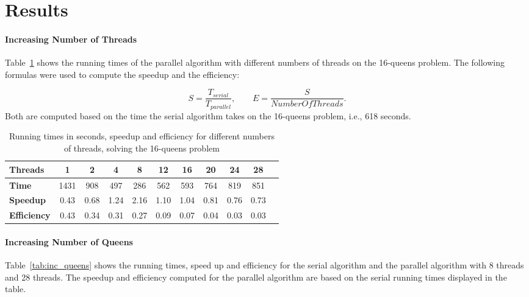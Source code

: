 \section{Results}

\paragraph{Increasing Number of Threads}
Table~\ref{tab:inc_threads} shows the running times of the parallel algorithm with different numbers of threads on the 16-queens problem.
The following formulas were used to compute the speedup and the efficiency:

\[S = \frac{T_{serial}}{T_{parallel}},  \qquad E = \frac{S}{NumberOfThreads}.\]
Both are computed based on the time the serial algorithm takes on the 16-queens problem, i.e., 618 seconds.

\begin{table}[!ht]
    \centering
    \begin{tabular}{l | c | c | c | c | c | c | c | c | c | c}
    \textbf{Threads}    & 1     & 2     & 4     & 8     & 12    & 16    & 20    & 24    & 28   \\ \hline
    \textbf{Time}       & 1431  & 908   & 497   & 286   & 562   & 593   & 764   & 819   & 851  \\
    \textbf{Speedup}    & 0.43  & 0.68  & 1.24  & 2.16  & 1.10  & 1.04  & 0.81  & 0.76  & 0.73 \\
    \textbf{Efficiency} & 0.43  & 0.34  & 0.31  & 0.27  & 0.09  & 0.07  & 0.04  & 0.03  & 0.03 \\
    
    \end{tabular}
    \caption{Running times in seconds, speedup and efficiency for different numbers of threads, solving the 16-queens problem}
    \label{tab:inc_threads}
\end{table}


\paragraph{Increasing Number of Queens}
Table~\ref{tab:inc_queens} shows the running times, speed up and efficiency for the serial algorithm and the parallel algorithm with 8 threads and 28 threads.
The speedup and efficiency computed for the parallel algorithm are based on the serial running times displayed in the table.

